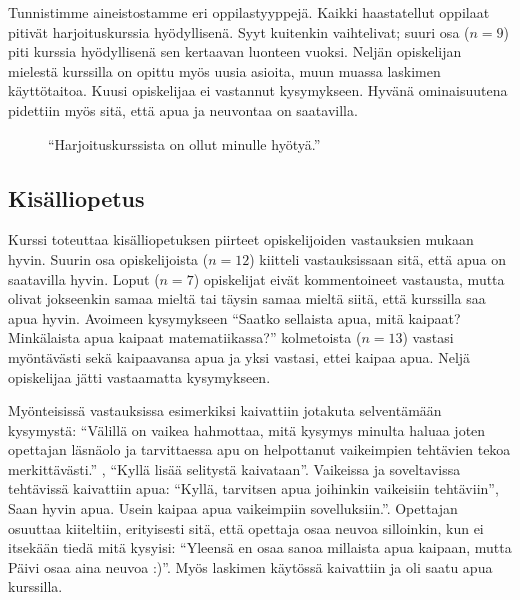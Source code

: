 Tunnistimme aineistostamme eri oppilastyyppejä.
Kaikki haastatellut oppilaat pitivät harjoituskurssia hyödyllisenä.
Syyt kuitenkin vaihtelivat; suuri osa ($n=9$) piti kurssia hyödyllisenä sen kertaavan luonteen vuoksi.
Neljän opiskelijan mielestä kurssilla on opittu myös uusia asioita, muun muassa laskimen käyttötaitoa.
Kuusi opiskelijaa ei vastannut kysymykseen.
Hyvänä ominaisuutena pidettiin myös sitä, että apua ja neuvontaa on saatavilla.

\begin{figure}[h!]
\centering
{}
\caption{``Harjoituskurssista on ollut minulle hyötyä.''}
\end{figure}

\subsection{Kisälliopetus}
Kurssi toteuttaa kisälliopetuksen piirteet opiskelijoiden vastauksien mukaan hyvin.
Suurin osa opiskelijoista ($n=12$) kiitteli vastauksissaan sitä, että apua on saatavilla hyvin.
Loput ($n=7$) opiskelijat eivät kommentoineet vastausta, mutta olivat jokseenkin samaa mieltä tai täysin samaa mieltä siitä, että kurssilla saa apua hyvin.
Avoimeen kysymykseen ``Saatko sellaista apua, mitä kaipaat? Minkälaista apua kaipaat matematiikassa?'' kolmetoista ($n=13$) vastasi myöntävästi sekä kaipaavansa apua ja yksi vastasi, ettei kaipaa apua. Neljä opiskelijaa jätti vastaamatta kysymykseen. 

Myönteisissä vastauksissa esimerkiksi kaivattiin jotakuta selventämään kysymystä: ``Välillä on vaikea hahmottaa, mitä kysymys minulta haluaa joten opettajan läsnäolo ja tarvittaessa apu on helpottanut vaikeimpien tehtävien tekoa merkittävästi.'' , ``Kyllä lisää selitystä kaivataan''. Vaikeissa ja soveltavissa tehtävissä kaivattiin apua: ``Kyllä, tarvitsen apua joihinkin vaikeisiin tehtäviin'', Saan hyvin apua. Usein kaipaa apua vaikeimpiin sovelluksiin.''. Opettajan osuuttaa kiiteltiin, erityisesti sitä, että opettaja osaa neuvoa silloinkin, kun ei itsekään tiedä mitä kysyisi: ``Yleensä en osaa sanoa millaista apua kaipaan, mutta Päivi osaa aina neuvoa :)''. Myös laskimen käytössä kaivattiin ja oli saatu apua kurssilla. 

